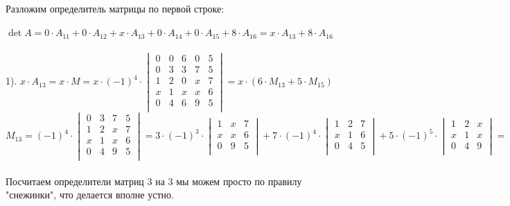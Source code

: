 \documentclass[a4paper, 12pt]{article}
\begin{document}
    \\
    \\ Разложим определитель матрицы по первой строке:
    \\
    \\ $\det A = 0 \cdot A_{11} + 0 \cdot A_{12} + x \cdot A_{13} + 0 \cdot A_{14} + 0 \cdot A_{15} + 8 \cdot A_{16} = x \cdot A_{13} + 8 \cdot A_{16}$
    \\
    \\ 1). $x \cdot A_{13} = x \cdot M = x \cdot (-1)^{4} \cdot \begin{vmatrix}
        0 & 0 & 6 & 0 & 5 \\
        0 & 3 & 3 & 7 & 5 \\
        1 & 2 & 0 & x & 7 \\
        x & 1 & x & x & 6 \\
        0 & 4 & 6 & 9 & 5 \\
    \end{vmatrix} = x \cdot \left(6 \cdot M_{13} + 5 \cdot M_{15}\right)$
    \\
    \[
        M_{13} = (-1)^{4} \cdot \begin{vmatrix}
            0 & 3 & 7 & 5 \\
            1 & 2 & x & 7 \\
            x & 1 & x & 6 \\
            0 & 4 & 9 & 5 \\
        \end{vmatrix} = 3 \cdot (-1)^3 \cdot \begin{vmatrix}
            1 & x & 7 \\
            x & x & 6 \\
            0 & 9 & 5 \\
        \end{vmatrix} + 7 \cdot (-1)^4 \cdot \begin{vmatrix}
            1 & 2 & 7 \\
            x & 1 & 6 \\
            0 & 4 & 5 \\
        \end{vmatrix} + 5 \cdot (-1)^5 \cdot \begin{vmatrix}
            1 & 2 & x \\
            x & 1 & x \\
            0 & 4 & 9 \\
        \end{vmatrix} =
    \]
    \\ Посчитаем определители матриц 3 на 3 мы можем просто по правилу "снежинки", что делается вполне устно.
\end{document}

